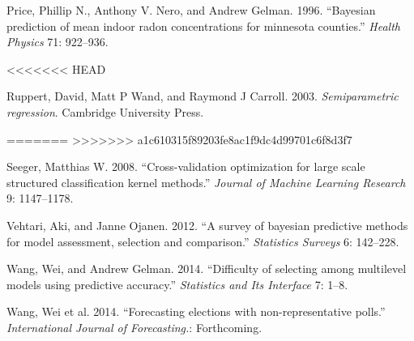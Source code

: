 \documentclass[11pt,article,oneside]{memoir}
\begin{document}
Price, Phillip N., Anthony V. Nero, and Andrew Gelman. 1996. ``Bayesian
prediction of mean indoor radon concentrations for minnesota counties.''
\emph{Health Physics} 71: 922--936.

<<<<<<< HEAD
Ruppert, David, Matt P Wand, and Raymond J Carroll. 2003.
\emph{Semiparametric regression}. Cambridge University Press.

=======
>>>>>>> a1c610315f89203fe8ac1f9dc4d99701c6f8d3f7
Seeger, Matthias W. 2008. ``Cross-validation optimization for large
scale structured classification kernel methods.'' \emph{Journal of
Machine Learning Research} 9: 1147--1178.

Vehtari, Aki, and Janne Ojanen. 2012. ``A survey of bayesian predictive
methods for model assessment, selection and comparison.''
\emph{Statistics Surveys} 6: 142--228.

Wang, Wei, and Andrew Gelman. 2014. ``Difficulty of selecting among
multilevel models using predictive accuracy.'' \emph{Statistics and Its
Interface} 7: 1--8.

Wang, Wei et al. 2014. ``Forecasting elections with non-representative
polls.'' \emph{International Journal of Forecasting.}: Forthcoming.
\end{document}
